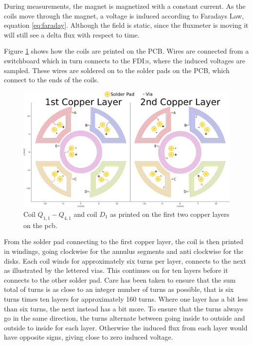 During measurements, the magnet is magnetized with a constant current.
As the coils move through the magnet, a voltage is induced according
to Faradays Law, equation \ref{eq:faraday}. Although the field is
static, since the fluxmeter is moving it will still see a delta
flux with respect to time.

Figure \ref{fig:pcbwindings} shows how the coils are printed on the 
PCB. Wires are connected from a switchboard which in turn connects to
the FDI:s, where the induced voltages are sampled. These wires are 
soldered on to the solder pads on the PCB, which connect to the ends
of the coils.

\begin{figure}[!h]
    \centering
    \includegraphics[width=\textwidth]{figs/pcb-coil-windings}
    \caption{Coil $Q_{1,1}-Q_{4,1}$ and coil $D_1$ as printed on the first
    two copper layers on the pcb.}
    \label{fig:pcbwindings}
\end{figure}

From the solder pad connecting to the first copper
layer, the coil is then printed in windings, going clockwise for the
annulus segments and anti clockwise for the disks. Each coil winds for
approximately six turns per layer, connects to the next as illustrated by
the lettered vias. This continues on for ten layers before it connects to
the other solder pad. Care has been taken to ensure that the sum total
of turns is as close to an integer number of turns as possible, that is
six turns times ten layers for approximately 160 turns. Where one layer
has a bit less than six turns, the next instead has a bit more. 
To ensure that the turns always go in the same direction, the turns alternate
between going inside to outside and outside to inside for each layer.
Otherwise the induced flux from each layer would have opposite signs,
giving close to zero induced voltage. 


